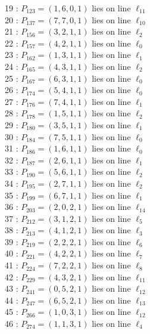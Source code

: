 \documentclass{article}
\begin{document}
{\begin{multicols}{2}
19 : $P_{123}=( 1, 6, 0, 1 )$ lies on line $\ell_{11}$\\
20 : $P_{137}=( 7, 7, 0, 1 )$ lies on line $\ell_{10}$\\
21 : $P_{156}=( 3, 2, 1, 1 )$ lies on line $\ell_{2}$\\
22 : $P_{157}=( 4, 2, 1, 1 )$ lies on line $\ell_{0}$\\
23 : $P_{162}=( 1, 3, 1, 1 )$ lies on line $\ell_{1}$\\
24 : $P_{165}=( 4, 3, 1, 1 )$ lies on line $\ell_{2}$\\
25 : $P_{167}=( 6, 3, 1, 1 )$ lies on line $\ell_{0}$\\
26 : $P_{174}=( 5, 4, 1, 1 )$ lies on line $\ell_{0}$\\
27 : $P_{176}=( 7, 4, 1, 1 )$ lies on line $\ell_{1}$\\
28 : $P_{178}=( 1, 5, 1, 1 )$ lies on line $\ell_{2}$\\
29 : $P_{180}=( 3, 5, 1, 1 )$ lies on line $\ell_{1}$\\
30 : $P_{184}=( 7, 5, 1, 1 )$ lies on line $\ell_{0}$\\
31 : $P_{186}=( 1, 6, 1, 1 )$ lies on line $\ell_{0}$\\
32 : $P_{187}=( 2, 6, 1, 1 )$ lies on line $\ell_{1}$\\
33 : $P_{190}=( 5, 6, 1, 1 )$ lies on line $\ell_{2}$\\
34 : $P_{195}=( 2, 7, 1, 1 )$ lies on line $\ell_{2}$\\
35 : $P_{199}=( 6, 7, 1, 1 )$ lies on line $\ell_{1}$\\
36 : $P_{203}=( 2, 0, 2, 1 )$ lies on line $\ell_{14}$\\
37 : $P_{212}=( 3, 1, 2, 1 )$ lies on line $\ell_{5}$\\
38 : $P_{213}=( 4, 1, 2, 1 )$ lies on line $\ell_{3}$\\
39 : $P_{219}=( 2, 2, 2, 1 )$ lies on line $\ell_{6}$\\
40 : $P_{221}=( 4, 2, 2, 1 )$ lies on line $\ell_{7}$\\
41 : $P_{224}=( 7, 2, 2, 1 )$ lies on line $\ell_{8}$\\
42 : $P_{229}=( 4, 3, 2, 1 )$ lies on line $\ell_{11}$\\
43 : $P_{241}=( 0, 5, 2, 1 )$ lies on line $\ell_{12}$\\
44 : $P_{247}=( 6, 5, 2, 1 )$ lies on line $\ell_{13}$\\
45 : $P_{266}=( 1, 0, 3, 1 )$ lies on line $\ell_{12}$\\
46 : $P_{274}=( 1, 1, 3, 1 )$ lies on line $\ell_{4}$\\

\end{multicols}}
\end{document}
